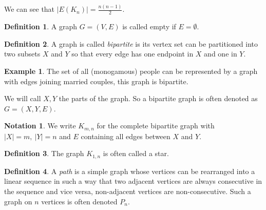 \documentclass{article}
\theoremstyle{definition}
\newtheorem*{defn}{Definition}
\newtheorem*{ex}{Example}
\newtheorem*{nota}{Notation}
\begin{document}
We can see that $|E(K_n)| = \frac{n(n-1)}{2}$.
\begin{defn}
A graph $G=(V,E)$ is called empty if $E=\emptyset$.
\end{defn}

\begin{defn}
A graph is called \emph{bipartite} is its vertex set can be partitioned into two subsets $X$ and $Y$ so that every edge has one endpoint in $X$ and one in $Y$.
\end{defn}

\begin{ex}
The set of all (monogamous) people can be represented by a graph with edges joining married couples, this graph is bipartite.
\end{ex}

We will call $X,Y$ the parts of the graph.
So a bipartite graph is often denoted as $G = (X,Y,E)$.
\begin{nota}
We write $K_{m,n}$ for the complete bipartite graph with $|X| = m,\ |Y| = n$ and $E$ containing all edges between $X$ and $Y$.
\end{nota}

\begin{defn}
The graph $K_{1,n}$ is often called a star.
\end{defn}
\begin{center}
\end{center}

\begin{defn}
A \emph{path} is a simple graph whose vertices can be rearranged into a linear sequence in such a way that two adjacent vertices are always consecutive in the sequence and vice versa, non-adjacent vertices are non-consecutive.
Such a graph on $n$ vertices is often denoted $P_n$.
\end{defn}
\begin{center}
\end{center}
\end{document}
